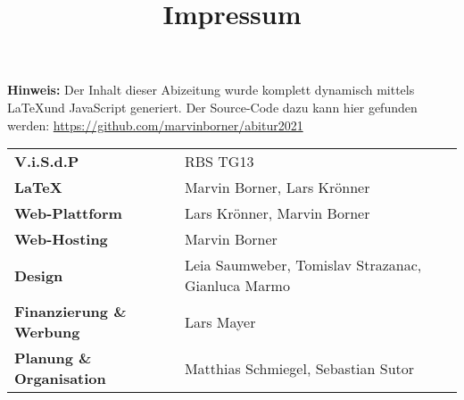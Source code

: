 \title{Impressum}


\textbf{Hinweis:} Der Inhalt dieser Abizeitung wurde komplett dynamisch mittels \LaTeX und JavaScript generiert. Der Source-Code dazu kann hier gefunden werden: \url{https://github.com/marvinborner/abitur2021}
\newline
\begin{table}[b]
	\begin{tabular}{ l l }
		\textbf{V.i.S.d.P}               & RBS TG13                                           \\ %
		\textbf{\LaTeX}                  & Marvin Borner, Lars Krönner                        \\
		\textbf{Web-Plattform}           & Lars Krönner, Marvin Borner                        \\
		\textbf{Web-Hosting}             & Marvin Borner                                      \\
		\textbf{Design}                  & Leia Saumweber, Tomislav Strazanac, Gianluca Marmo \\
		\textbf{Finanzierung \& Werbung} & Lars Mayer                                         \\
		\textbf{Planung \& Organisation} & Matthias Schmiegel, Sebastian Sutor                \\
	\end{tabular}
\end{table}
